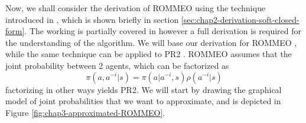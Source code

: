 Now, we shall consider the derivation of ROMMEO using the technique introduced in \cite{levine2018reinforcement}, which is shown briefly in section \ref{sec:chap2-derivation-soft-closed-form}. The working is partially covered in \cite{yu2019multi, wen2019multi} however a full derivation is required for the understanding of the algorithm. We will base our derivation for ROMMEO \cite{tian2019regularized}, while the same technique can be applied to PR2 \cite{wen2019probabilistic}. ROMMEO assumes that the joint probability between 2 agents, which can be factorized as
\begin{equation}
    \pi(a, a^{-i} | s) = \pi(a | a^{-i}, s) \rho(a^{-i} | s)
\end{equation}
factorizing in other ways yields PR2. We will start by drawing the graphical model of joint probabilities that we want to approximate, and is depicted in Figure \ref{fig:chap3-approximated-ROMMEO}. 
